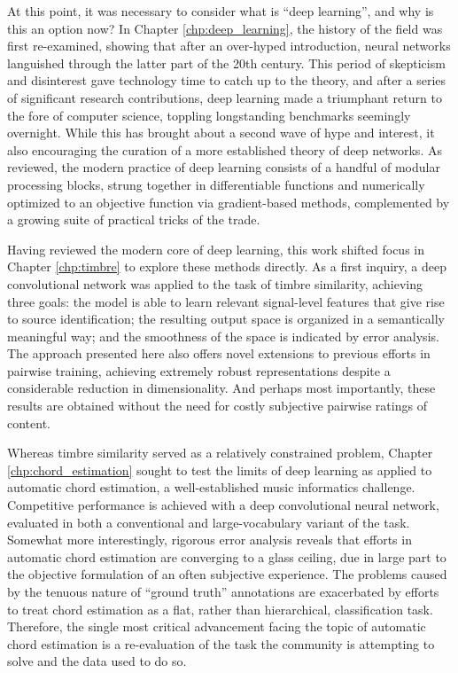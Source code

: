 At this point, it was necessary to consider what is ``deep learning'', and why is this an option now?
In Chapter \ref{chp:deep_learning}, the history of the field was first re-examined, showing that after an over-hyped introduction, neural networks languished through the latter part of the 20th century.
This period of skepticism and disinterest gave technology time to catch up to the theory, and after a series of significant research contributions, deep learning made a triumphant return to the fore of computer science, toppling longstanding benchmarks seemingly overnight.
While this has brought about a second wave of hype and interest, it also encouraging the curation of a more established theory of deep networks.
As reviewed, the modern practice of deep learning consists of a handful of modular processing blocks, strung together in differentiable functions and numerically optimized to an objective function via gradient-based methods, complemented by a growing suite of practical tricks of the trade.

Having reviewed the modern core of deep learning, this work shifted focus in Chapter \ref{chp:timbre} to explore these methods directly.
As a first inquiry, a deep convolutional network was applied to the task of timbre similarity, achieving three goals:
the model is able to learn relevant signal-level features that give rise to source identification;
the resulting output space is organized in a semantically meaningful way;
and the smoothness of the space is indicated by error analysis.
The approach presented here also offers novel extensions to previous efforts in pairwise training, achieving extremely robust representations despite a considerable reduction in dimensionality.
And perhaps most importantly, these results are obtained without the need for costly subjective pairwise ratings of content.

Whereas timbre similarity served as a relatively constrained problem, Chapter \ref{chp:chord_estimation} sought to test the limits of deep learning as applied to automatic chord estimation, a well-established music informatics challenge.
Competitive performance is achieved with a deep convolutional neural network, evaluated in both a conventional and large-vocabulary variant of the task.
Somewhat more interestingly, rigorous error analysis reveals that efforts in automatic chord estimation are converging to a glass ceiling, due in large part to the objective formulation of an often subjective experience.
The problems caused by the tenuous nature of ``ground truth'' annotations are exacerbated by efforts to treat chord estimation as a flat, rather than hierarchical, classification task.
Therefore, the single most critical advancement facing the topic of automatic chord estimation is a re-evaluation of the task the community is attempting to solve and the data used to do so.

